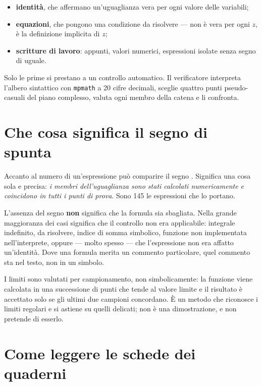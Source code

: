\begin{itemize}[leftmargin=1.4em,itemsep=3pt]
  \item \textbf{identit\`a}, che affermano un'uguaglianza vera per ogni
        valore delle variabili;
  \item \textbf{equazioni}, che pongono una condizione da risolvere ---
         non \`e vera per ogni $z$, \`e
        la definizione implicita di $z$;
  \item \textbf{scritture di lavoro}: appunti, valori numerici, espressioni
        isolate senza segno di uguale.
\end{itemize}

\noindent
Solo le prime si prestano a un controllo automatico. Il verificatore
interpreta l'albero sintattico con \texttt{mpmath} a 20 cifre decimali,
sceglie quattro punti pseudo-casuali del piano complesso, valuta ogni
membro della catena e li confronta.

\section{Che cosa significa il segno di spunta}

Accanto al numero di un'espressione pu\`o comparire il segno
\verificata. Significa una cosa sola e precisa: \emph{i membri
dell'uguaglianza sono stati calcolati numericamente e coincidono in tutti i
punti di prova}. Sono 145 le espressioni che lo portano.

L'assenza del segno \textbf{non} significa che la formula sia sbagliata.
Nella grande maggioranza dei casi significa che il controllo non era
applicabile: integrale indefinito,  da risolvere, indice di
somma simbolico, funzione non implementata nell'interprete, oppure ---
molto spesso --- che l'espressione non era affatto un'identit\`a. Dove una
formula merita un commento particolare, quel commento sta nel testo, non in
un simbolo.

\begin{osservazione}
I limiti sono valutati per campionamento, non simbolicamente: la funzione
viene calcolata in una successione di punti che tende al valore limite e il
risultato \`e accettato solo se gli ultimi due campioni concordano. \`E un
metodo che riconosce i limiti regolari e si astiene su quelli delicati; non
\`e una dimostrazione, e non pretende di esserlo.
\end{osservazione}

\section{Come leggere le schede dei quaderni}

